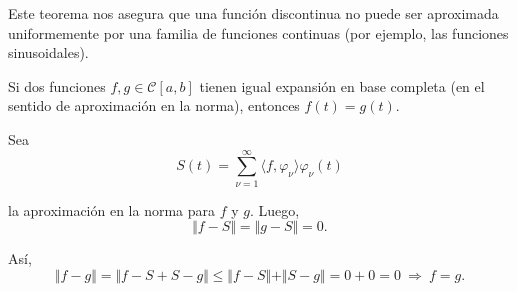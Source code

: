Este teorema nos asegura que una función discontinua no puede ser aproximada uniformemente por una familia de funciones continuas (por ejemplo, las funciones sinusoidales).

\begin{teorema}
Si dos funciones $f,g \in \mathscr{C}[a,b]$ tienen igual expansión en base completa (en el sentido de aproximación en la norma), entonces $f(t) = g(t)$.
\end{teorema}

\begin{demo}
Sea
$$S(t) = \sum_{\nu = 1}^{\infty} \langle f, \varphi_{\nu}\rangle \varphi_{\nu}(t)$$

la aproximación en la norma para $f$ y $g$. Luego, 
$$\Vert f-S \Vert = \Vert g-S \Vert = 0.$$

Así, 
\begin{equation*}
    \Vert f-g \Vert = \Vert f-S+S-g \Vert \leq \Vert f-S \Vert + \Vert S-g \Vert = 0 +0 = 0 ~\Rightarrow~ f = g.
\end{equation*}

\end{demo}







